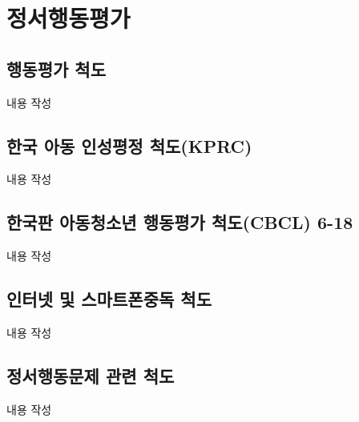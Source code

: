 \section{정서행동평가}

\subsection{행동평가 척도}
내용 작성

\subsection{한국 아동 인성평정 척도(KPRC)}
내용 작성

\subsection{한국판 아동청소년 행동평가 척도(CBCL) 6-18}
내용 작성

\subsection{인터넷 및 스마트폰중독 척도}
내용 작성

\subsection{정서행동문제 관련 척도}
내용 작성
